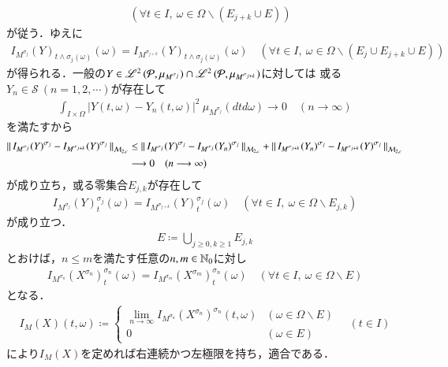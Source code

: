 \begin{prf}
\begin{description}
\begin{align}
					\quad (\forall t \in I,\ \omega \in \Omega \backslash (E_{j+k} \cup E))
				\end{align}
				が従う．ゆえに
				\begin{align}
					I_{M^{\sigma_j}}(Y)_{t \wedge \sigma_j(\omega)}(\omega) = I_{M^{\sigma_{j+k}}}(Y)_{t \wedge \sigma_j(\omega)}(\omega)
					\quad (\forall t \in I,\ \omega \in \Omega \backslash (E_j \cup E_{j+k} \cup E))
				\end{align}
				が得られる．一般の$Y \in \mathscr{L}^{2} \left(\mathcal{P},\mu_{M^{\sigma_j}}\right) \cap \mathscr{L}^{2} \left(\mathcal{P},\mu_{M^{\sigma_{j+k}}}\right)$に対しては
				或る$Y_n \in \mathcal{S}\ (n=1,2,\cdots)$が存在して
				\begin{align}
					\int_{I \times \Omega} \left| Y(t,\omega) - Y_n(t,\omega) \right|^2\ \mu_{M^{\sigma_j}}(dtd\omega)
					\longrightarrow 0
					\quad (n \longrightarrow \infty)
				\end{align}
				を満たすから
				\begin{align}
					\left\|\, I_{M^{\sigma_j}}(Y)^{\sigma_j} - I_{M^{\sigma_{j+k}}}(Y)^{\sigma_j}\, \right\|_{\mathcal{M}_{2,c}}
					&\leq \left\|\, I_{M^{\sigma_j}}(Y)^{\sigma_j} - I_{M^{\sigma_j}}(Y_n)^{\sigma_j}\, \right\|_{\mathcal{M}_{2,c}}
						+ \left\|\, I_{M^{\sigma_{j+k}}}(Y_n)^{\sigma_j} - I_{M^{\sigma_{j+k}}}(Y)^{\sigma_j}\, \right\|_{\mathcal{M}_{2,c}} \\
					&\longrightarrow 0 \quad (n \longrightarrow \infty)
				\end{align}
				が成り立ち，或る零集合$E_{j,k}$が存在して
				\begin{align}
					I_{M^{\sigma_j}}(Y)^{\sigma_j}_t(\omega) = I_{M^{\sigma_{j+k}}}(Y)^{\sigma_j}_t(\omega)
					\quad (\forall t \in I,\ \omega \in \Omega \backslash E_{j,k})
				\end{align}
				が成り立つ．
				\begin{align}
					E \coloneqq \bigcup_{j \geq 0,k \geq 1} E_{j,k}
				\end{align}
				とおけば，$n \leq m$を満たす任意の$n,m \in \mathbb{N}_0$に対し
				\begin{align}
					I_{M^{\sigma_n}}(X^{\sigma_n})^{\sigma_n}_t(\omega) = I_{M^{\sigma_m}}(X^{\sigma_m})^{\sigma_n}_t(\omega)
					\quad (\forall t \in I,\ \omega \in \Omega \backslash E)
				\end{align}
				となる．
				\begin{align}
					I_M(X)(t,\omega) \coloneqq 
					\begin{cases}
						\lim\limits_{n \to \infty} I_{M^{\sigma_n}}(X^{\sigma_n})^{\sigma_n}(t,\omega) & (\omega \in \Omega \backslash E) \\
						0 & (\omega \in E)
					\end{cases}
					\quad (t \in I)
				\end{align}
				により$I_M(X)$を定めれば右連続かつ左極限を持ち，適合である．
		\end{description}
		\QED
	\end{prf}
	